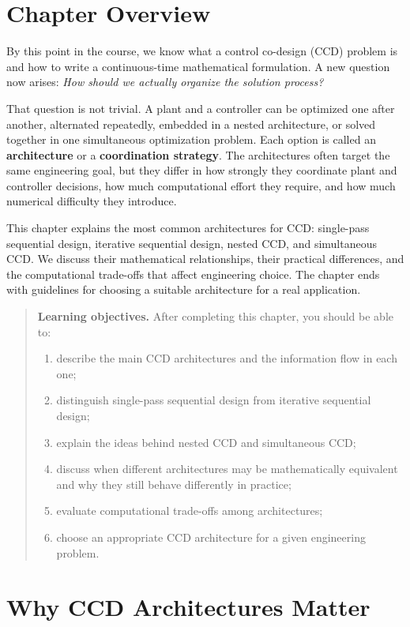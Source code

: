 \documentclass[11pt]{article}
\newenvironment{learningobjectives}{%
\begin{quote}\textbf{Learning objectives.} After completing this chapter, you should be able to:
\begin{enumerate}[leftmargin=1.4em,itemsep=0.35em,topsep=0.5em]
}{\end{enumerate}\end{quote}}
\begin{document}
\tableofcontents
\newpage

\section*{Chapter Overview}

By this point in the course, we know what a control co-design (CCD) problem is and how to write a continuous-time mathematical formulation. A new question now arises: \emph{How should we actually organize the solution process?}

That question is not trivial. A plant and a controller can be optimized one after another, alternated repeatedly, embedded in a nested architecture, or solved together in one simultaneous optimization problem. Each option is called an \textbf{architecture} or a \textbf{coordination strategy}. The architectures often target the same engineering goal, but they differ in how strongly they coordinate plant and controller decisions, how much computational effort they require, and how much numerical difficulty they introduce.

This chapter explains the most common architectures for CCD: single-pass sequential design, iterative sequential design, nested CCD, and simultaneous CCD. We discuss their mathematical relationships, their practical differences, and the computational trade-offs that affect engineering choice. The chapter ends with guidelines for choosing a suitable architecture for a real application.

\begin{learningobjectives}
  \item describe the main CCD architectures and the information flow in each one;
  \item distinguish single-pass sequential design from iterative sequential design;
  \item explain the ideas behind nested CCD and simultaneous CCD;
  \item discuss when different architectures may be mathematically equivalent and why they still behave differently in practice;
  \item evaluate computational trade-offs among architectures;
  \item choose an appropriate CCD architecture for a given engineering problem.
\end{learningobjectives}

\section{Why CCD Architectures Matter}
\end{document}

